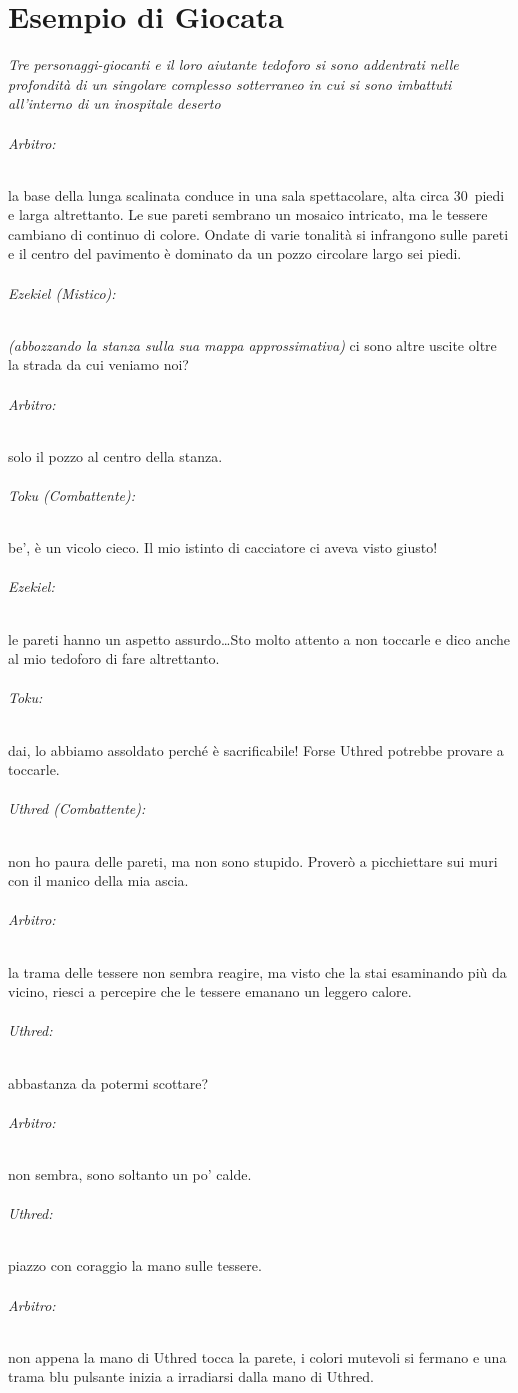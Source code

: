 \documentclass[itdr]{subfiles}
\begin{document}
\chapter{Esempio di Giocata}
\label{ch:esempio_di_giocata}
{

{\em Tre personaggi-giocanti e il loro aiutante tedoforo si sono addentrati nelle profondità di un singolare complesso sotterraneo in cui si sono imbattuti all'interno di un inospitale deserto}

\vfill

\subparagraph{Arbitro:} la base della lunga scalinata conduce in una sala spettacolare, alta circa 30~piedi e larga altrettanto. Le sue pareti sembrano un mosaico intricato, ma le tessere cambiano di continuo di colore. Ondate di varie tonalità si infrangono sulle pareti e il centro del pavimento è dominato da un pozzo circolare largo sei piedi.

\subparagraph{Ezekiel (Mistico):} {\em (abbozzando la stanza sulla sua mappa approssimativa)} ci sono altre uscite oltre la strada da cui veniamo noi?

\subparagraph{Arbitro:} solo il pozzo al centro della stanza.

\subparagraph{Toku (Combattente):} be', è un vicolo cieco. Il mio istinto di cacciatore ci aveva visto giusto!

\subparagraph{Ezekiel:} le pareti hanno un aspetto assurdo\ldots Sto molto attento a non toccarle e dico anche al mio tedoforo di fare altrettanto.

\subparagraph{Toku:} dai, lo abbiamo assoldato perché è sacrificabile! Forse Uthred potrebbe provare a toccarle.

\subparagraph{Uthred (Combattente):} non ho paura delle pareti, ma non sono stupido. Proverò a picchiettare sui muri con il manico della mia ascia.

\subparagraph{Arbitro:} la trama delle tessere non sembra reagire, ma visto che la stai esaminando più da vicino, riesci a percepire che le tessere emanano un leggero calore.

\subparagraph{Uthred:} abbastanza da potermi scottare?

\subparagraph{Arbitro:} non sembra, sono soltanto un po' calde.

\subparagraph{Uthred:} piazzo con coraggio la mano sulle tessere.

\subparagraph{Arbitro:} non appena la mano di Uthred tocca la parete, i colori mutevoli si fermano e una trama blu pulsante inizia a irradiarsi dalla mano di Uthred.

}
\end{document}
